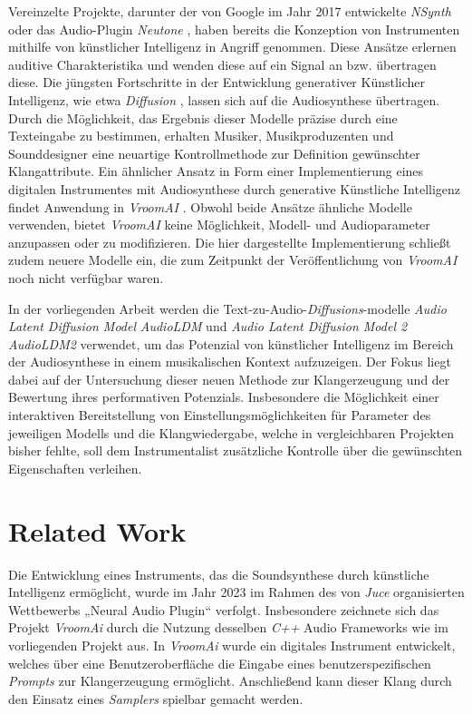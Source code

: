 \documentclass[
  a4paper,  %
  twoside,  %
  bibliography=totoc,
  headsepline,
  cleardoublepage=empty,
  parskip=half,
  draft=false
]{scrbook}
\begin{document}
Vereinzelte Projekte, darunter der von Google im Jahr 2017 entwickelte \emph{NSynth} \cite{google_ai_nsynth_2017} oder das Audio-Plugin \emph{Neutone} \cite{qosmo_neutone_nodate}, haben bereits die Konzeption von Instrumenten mithilfe von künstlicher Intelligenz in Angriff genommen. Diese Ansätze erlernen auditive Charakteristika und wenden diese auf ein Signal an bzw. übertragen diese. Die jüngsten Fortschritte in der Entwicklung generativer Künstlicher Intelligenz, wie etwa \emph{Diffusion} \cite{sohl-dickstein_deep_2015, ho_denoising_2020, nichol_improved_2021, dhariwal_diffusion_2021}, lassen sich auf die Audiosynthese übertragen. Durch die Möglichkeit, das Ergebnis dieser Modelle präzise durch eine Texteingabe zu bestimmen, erhalten Musiker, Musikproduzenten und Sounddesigner eine neuartige Kontrollmethode zur Definition gewünschter Klangattribute. Ein ähnlicher Ansatz in Form einer Implementierung eines digitalen Instrumentes mit Audiosynthese durch generative Künstliche Intelligenz findet Anwendung in \emph{VroomAI} \cite{barney_hill_vroomai_2023}.  Obwohl beide Ansätze ähnliche Modelle verwenden, bietet \emph{VroomAI} keine Möglichkeit, Modell- und Audioparameter anzupassen oder zu modifizieren. Die hier dargestellte Implementierung schließt zudem neuere Modelle ein, die zum Zeitpunkt der Veröffentlichung von \emph{VroomAI} noch nicht verfügbar waren.

In der vorliegenden Arbeit werden die Text-zu-Audio-\emph{Diffusions}-modelle \emph{Audio Latent Diffusion Model} \emph{AudioLDM} \cite{liu_audioldm_2023} und  \emph{Audio Latent Diffusion Model 2} \emph{AudioLDM2} \cite{liu_audioldm2_2023} verwendet, um das Potenzial von künstlicher Intelligenz im Bereich der Audiosynthese in einem musikalischen Kontext aufzuzeigen. Der Fokus liegt dabei auf der Untersuchung dieser neuen Methode zur Klangerzeugung und der Bewertung ihres performativen Potenzials. Insbesondere die Möglichkeit einer interaktiven Bereitstellung von Einstellungsmöglichkeiten für Parameter des jeweiligen Modells und die Klangwiedergabe, welche in vergleichbaren Projekten bisher fehlte, soll dem Instrumentalist zusätzliche Kontrolle über die gewünschten Eigenschaften verleihen.

\chapter{Related Work}


Die Entwicklung eines Instruments, das die Soundsynthese durch künstliche Intelligenz ermöglicht, wurde im Jahr 2023 im Rahmen des von \emph{Juce} \cite{noauthor_juce_nodate} organisierten Wettbewerbs „Neural Audio Plugin“ verfolgt. Insbesondere zeichnete sich das Projekt \emph{VroomAi} \cite{barney_hill_vroomai_2023} durch die Nutzung desselben \emph{C++} Audio Frameworks wie im vorliegenden Projekt aus. In \emph{VroomAi} wurde ein digitales Instrument entwickelt, welches über eine Benutzeroberfläche die Eingabe eines benutzerspezifischen \emph{Prompts} zur Klangerzeugung ermöglicht. Anschließend kann dieser Klang durch den Einsatz eines \emph{Samplers} spielbar gemacht werden.
\end{document}
